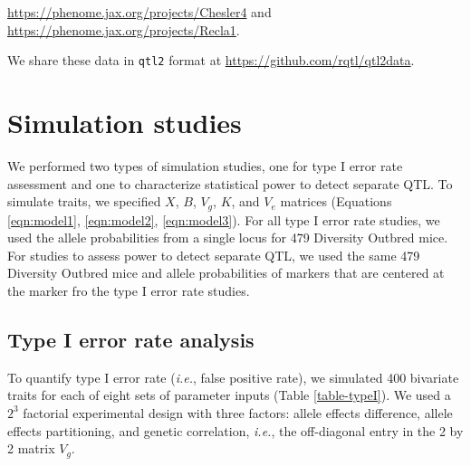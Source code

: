 \documentclass[12pt,twoside, lineno]{gsajnl}
\begin{document}
\href{https://phenome.jax.org/projects/Chesler4}{https://phenome.jax.org/projects/Chesler4} and \href{https://phenome.jax.org/projects/Recla1}{https://phenome.jax.org/projects/Recla1}.

\noindent We share these data in \texttt{qtl2} format at \href{https://github.com/rqtl/qtl2data}{https://github.com/rqtl/qtl2data}.





\section{Simulation studies}

We performed two types of simulation studies, one for type I error rate assessment and one to characterize statistical power to detect separate QTL. To simulate traits, we specified $X$, $B$, $V_g$, $K$, and $V_e$ matrices (Equations \ref{eqn:model1}, \ref{eqn:model2}, \ref{eqn:model3}). For all type I error rate studies, we used the allele probabilities from a single locus for 479 Diversity Outbred mice. For studies to assess power to detect separate QTL, we used the same 479 Diversity Outbred mice and allele probabilities of markers that are centered at the marker fro
the type I error rate studies.

\subsection{Type I error rate analysis}


To quantify type I error rate ({\em i.e.}, false positive rate), we simulated 400 bivariate traits for each of eight sets of parameter inputs (Table \ref{table-typeI}). We used a $2^3$ factorial experimental design with three factors: allele effects difference, allele effects partitioning, and genetic correlation, \textit{i.e.}, the off-diagonal entry in the 2 by 2 matrix $V_g$.
\end{document}
